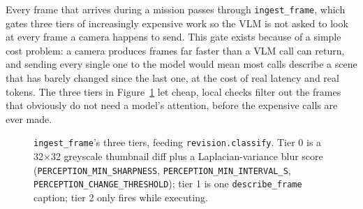 \label{ssec:revision_impl}

Every frame that arrives during a mission passes through
\texttt{ingest\_frame}, which gates three tiers of increasingly expensive
work so the VLM is not asked to look at every frame a camera happens to
send. This gate exists because of a simple cost problem: a camera produces
frames far faster than a VLM call can return, and sending every single one
to the model would mean most calls describe a scene that has barely
changed since the last one, at the cost of real latency and real tokens.
The three tiers in Figure~\ref{fig:flow-revision} let cheap, local checks
filter out the frames that obviously do not need a model's attention,
before the expensive calls are ever made.

\begin{figure}[htbp]
  \centering
  \caption{\texttt{ingest\_frame}'s three tiers, feeding \texttt{revision.classify}. Tier 0 is a 32$\times$32 greyscale thumbnail diff plus a Laplacian-variance blur score (\texttt{PERCEPTION\_MIN\_SHARPNESS}, \texttt{PERCEPTION\_MIN\_INTERVAL\_S}, \texttt{PERCEPTION\_CHANGE\_THRESHOLD}); tier 1 is one \texttt{describe\_frame} caption; tier 2 only fires while executing.}
  \label{fig:flow-revision}
\end{figure}

